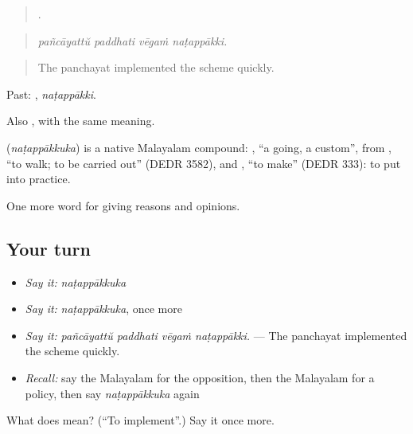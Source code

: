 \begin{quote}
   .
\end{quote}

\begin{quote}
\emph{pañcāyattŭ paddhati vēgaṁ naṭappākki.}
\end{quote}

\begin{quote}
The panchayat implemented the scheme quickly.
\end{quote}

Past: , \emph{naṭappākki}.

Also , with the same meaning.

\begin{cousinweb}
\textbf{} (\emph{naṭappākkuka}) is a native Malayalam compound: , \textquotedblleft{}a going, a custom\textquotedblright{}, from , \textquotedblleft{}to walk; to be carried out\textquotedblright{} (DEDR 3582), and , \textquotedblleft{}to make\textquotedblright{} (DEDR 333): to put into practice.
\end{cousinweb}

\begin{grammarlens}[title={What you've built}]
One more word for giving reasons and opinions.
\end{grammarlens}

\subsection*{Your turn}
\begin{itemize}
\raggedright
  \item \emph{Say it:} \emph{naṭappākkuka}
  \item \emph{Say it:} \emph{naṭappākkuka}, once more
  \item \emph{Say it:} \emph{pañcāyattŭ paddhati vēgaṁ naṭappākki.} — The panchayat implemented the scheme quickly.
  \item \emph{Recall:} say the Malayalam for the opposition, then the Malayalam for a policy, then say \emph{naṭappākkuka} again
\end{itemize}

\begin{tcolorbox}[breakable,colback=teal!4,colframe=teal!35!black,title={Before you move on}]
What does  mean? (\textquotedblleft{}To implement\textquotedblright{}.) Say it once more.
\end{tcolorbox}
